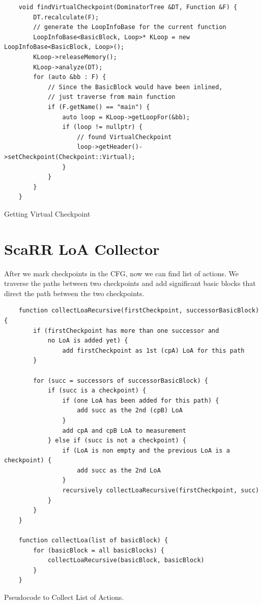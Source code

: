 \begin{listing}[htbp]
    \begin{verbatim}
    void findVirtualCheckpoint(DominatorTree &DT, Function &F) {
        DT.recalculate(F);
        // generate the LoopInfoBase for the current function
        LoopInfoBase<BasicBlock, Loop>* KLoop = new LoopInfoBase<BasicBlock, Loop>();
        KLoop->releaseMemory();
        KLoop->analyze(DT);
        for (auto &bb : F) {
            // Since the BasicBlock would have been inlined, 
            // just traverse from main function
            if (F.getName() == "main") {
                auto loop = KLoop->getLoopFor(&bb);
                if (loop != nullptr) {
                    // found VirtualCheckpoint
                    loop->getHeader()->setCheckpoint(Checkpoint::Virtual);
                }
            }
        }
    }
    \end{verbatim}
    \caption{Getting Virtual Checkpoint}
    \label{listing:virtual-cp}
\end{listing}




\section{ScaRR LoA Collector}
\label{sec:scarr-loa-collector}

After we mark checkpoints in the CFG, now we can find list of actions. We
traverse the paths between two checkpoints and add significant basic blocks that
direct the path between the two checkpoints.  

\begin{listing}[t]
    \begin{verbatim}
    function collectLoaRecursive(firstCheckpoint, successorBasicBlock) {
        if (firstCheckpoint has more than one successor and 
            no LoA is added yet) {
                add firstCheckpoint as 1st (cpA) LoA for this path
        }
        
        for (succ = successors of successorBasicBlock) {
            if (succ is a checkpoint) {
                if (one LoA has been added for this path) {
                    add succ as the 2nd (cpB) LoA
                }
                add cpA and cpB LoA to measurement
            } else if (succ is not a checkpoint) {
                if (LoA is non empty and the previous LoA is a checkpoint) {
                    add succ as the 2nd LoA
                }
                recursively collectLoaRecursive(firstCheckpoint, succ)
            }
        }
    }

    function collectLoa(list of basicBlock) {
        for (basicBlock = all basicBlocks) {
            collectLoaRecursive(basicBlock, basicBlock)
        }
    }
    \end{verbatim}
    \caption{Pseudocode to Collect List of Actions.}
    \label{listing:loa-pseudocode}
\end{listing}

